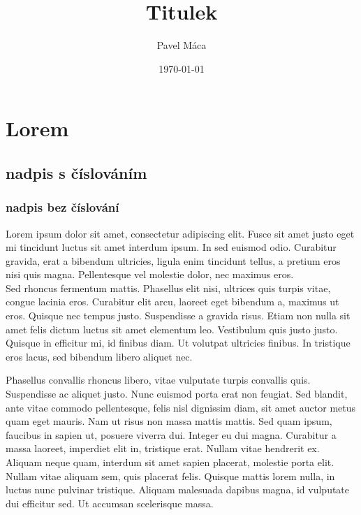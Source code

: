 \documentclass[12pt,a4paper]{report}
\begin{document}
 
\author{Pavel Máca}
\title{Titulek}
\date{\today}
\maketitle
\newpage

\pagestyle{empty}

\tableofcontents

\chapter{Lorem}
\section{nadpis s číslováním}
\subsection*{nadpis bez číslování}
Lorem ipsum dolor sit amet, consectetur adipiscing elit. Fusce sit amet justo eget mi tincidunt luctus sit amet interdum ipsum. In sed euismod odio. Curabitur gravida, erat a bibendum ultricies, ligula enim tincidunt tellus, a pretium eros nisi quis magna. Pellentesque vel molestie dolor, nec maximus eros.\\ Sed rhoncus fermentum mattis. Phasellus elit nisi, ultrices quis turpis vitae, congue lacinia eros. Curabitur elit arcu, laoreet eget bibendum a, maximus ut eros. Quisque nec tempus justo. Suspendisse a gravida risus. Etiam non nulla sit amet felis dictum luctus sit amet elementum leo. Vestibulum quis justo justo. Quisque in efficitur mi, id finibus diam. Ut volutpat ultricies finibus. In tristique eros lacus, sed bibendum libero aliquet nec.

\noident Phasellus convallis rhoncus libero, vitae vulputate turpis convallis quis. Suspendisse ac aliquet justo. Nunc euismod porta erat non feugiat. Sed blandit, ante vitae commodo pellentesque, felis nisl dignissim diam, sit amet auctor metus quam eget mauris. Nam ut risus non massa mattis mattis. Sed quam ipsum, faucibus in sapien ut, posuere viverra dui. Integer eu dui magna. Curabitur a massa laoreet, imperdiet elit in, tristique erat. Nullam vitae hendrerit ex. Aliquam neque quam, interdum sit amet sapien placerat, molestie porta elit. Nullam vitae aliquam sem, quis placerat felis. Quisque mattis lorem nulla, in luctus nunc pulvinar tristique. Aliquam malesuada dapibus magna, id vulputate dui efficitur sed. Ut accumsan scelerisque massa.
\end{document}
